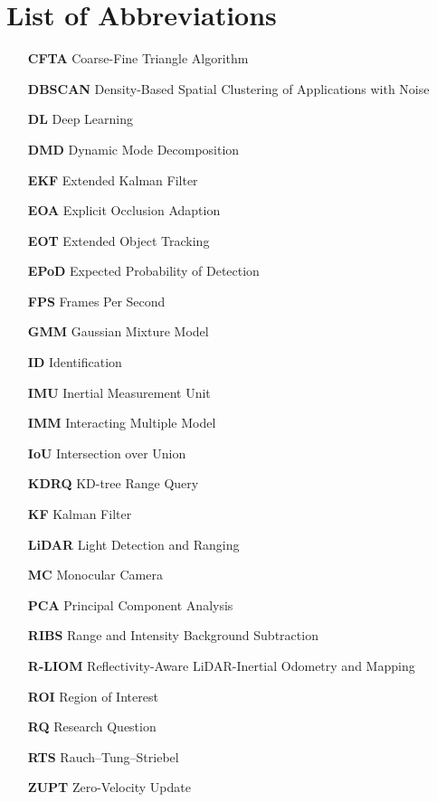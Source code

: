 \documentclass[11pt,a4paper]{report}
\begin{document}

\chapter*{List of Abbreviations}

\begin{itemize}[leftmargin=3cm, labelsep=1cm]
    \item[\textbf{CFTA}] Coarse-Fine Triangle Algorithm
    \item[\textbf{DBSCAN}] Density-Based Spatial Clustering of Applications with Noise
    \item[\textbf{DL}] Deep Learning
    \item[\textbf{DMD}] Dynamic Mode Decomposition
    \item[\textbf{EKF}] Extended Kalman Filter
    \item[\textbf{EOA}] Explicit Occlusion Adaption
    \item[\textbf{EOT}] Extended Object Tracking
    \item[\textbf{EPoD}] Expected Probability of Detection
    \item[\textbf{FPS}] Frames Per Second
    \item[\textbf{GMM}] Gaussian Mixture Model
    \item[\textbf{ID}] Identification
    \item[\textbf{IMU}] Inertial Measurement Unit
    \item[\textbf{IMM}] Interacting Multiple Model
    \item[\textbf{IoU}] Intersection over Union
    \item[\textbf{KDRQ}] KD-tree Range Query
    \item[\textbf{KF}] Kalman Filter
    \item[\textbf{LiDAR}] Light Detection and Ranging
    \item[\textbf{MC}] Monocular Camera
    \item[\textbf{PCA}] Principal Component Analysis
    \item[\textbf{RIBS}] Range and Intensity Background Subtraction
    \item[\textbf{R-LIOM}] Reflectivity-Aware LiDAR-Inertial Odometry and Mapping
    \item[\textbf{ROI}] Region of Interest
    \item[\textbf{RQ}] Research Question
    \item[\textbf{RTS}] Rauch--Tung--Striebel
    \item[\textbf{ZUPT}] Zero-Velocity Update
\end{itemize}
\end{document}
